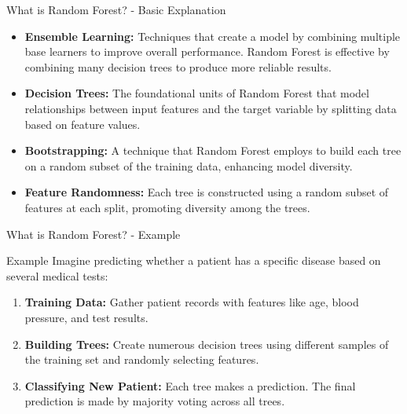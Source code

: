 \documentclass[aspectratio=169]{beamer}
\begin{document}
\begin{frame}[fragile]{What is Random Forest? - Basic Explanation}
    \begin{itemize}
        \item \textbf{Ensemble Learning:} Techniques that create a model by combining multiple base learners to improve overall performance. 
        Random Forest is effective by combining many decision trees to produce more reliable results.
        
        \item \textbf{Decision Trees:} The foundational units of Random Forest that model relationships between input features and the target variable by splitting data based on feature values.
        
        \item \textbf{Bootstrapping:} A technique that Random Forest employs to build each tree on a random subset of the training data, enhancing model diversity.
        
        \item \textbf{Feature Randomness:} Each tree is constructed using a random subset of features at each split, promoting diversity among the trees.
    \end{itemize}
\end{frame}

\begin{frame}[fragile]{What is Random Forest? - Example}
    \begin{block}{Example}
        Imagine predicting whether a patient has a specific disease based on several medical tests:
        \begin{enumerate}
            \item \textbf{Training Data:} Gather patient records with features like age, blood pressure, and test results.
            \item \textbf{Building Trees:} Create numerous decision trees using different samples of the training set and randomly selecting features.
            \item \textbf{Classifying New Patient:} Each tree makes a prediction. The final prediction is made by majority voting across all trees.
        \end{enumerate}
    \end{block}
\end{frame}
\end{document}
